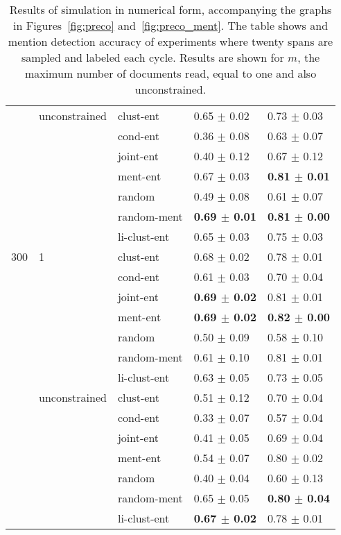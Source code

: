 \begin{table*}
\begin{tabular}{lllll}
    \cline{2-5}
    & unconstrained & clust-ent &  0.65 $\pm$ 0.02 &  0.73 $\pm$ 0.03 \\
    &               & cond-ent &  0.36 $\pm$ 0.08 &  0.63 $\pm$ 0.07 \\
    &               & joint-ent &  0.40 $\pm$ 0.12 &  0.67 $\pm$ 0.12 \\
    &               & ment-ent &  0.67 $\pm$ 0.03 &  \textbf{0.81 $\pm$ 0.01} \\
    &               & random &  0.49 $\pm$ 0.08 &  0.61 $\pm$ 0.07 \\
    &               & random-ment &  \textbf{0.69 $\pm$ 0.01} &  \textbf{0.81 $\pm$ 0.00} \\
    &               & li-clust-ent &  0.65 $\pm$ 0.03 &  0.75 $\pm$ 0.03 \\
    \cline{1-5}
300 & 1 & clust-ent &  0.68 $\pm$ 0.02 &  0.78 $\pm$ 0.01 \\
    &               & cond-ent &  0.61 $\pm$ 0.03 &  0.70 $\pm$ 0.04 \\
    &               & joint-ent &  \textbf{0.69 $\pm$ 0.02} &  0.81 $\pm$ 0.01 \\
    &               & ment-ent &  \textbf{0.69 $\pm$ 0.02} &  \textbf{0.82 $\pm$ 0.00} \\
    &               & random &  0.50 $\pm$ 0.09 &  0.58 $\pm$ 0.10 \\
    &               & random-ment &  0.61 $\pm$ 0.10 &  0.81 $\pm$ 0.01 \\
    &               & li-clust-ent &  0.63 $\pm$ 0.05 &  0.73 $\pm$ 0.05 \\
    \cline{2-5}
    & unconstrained & clust-ent &  0.51 $\pm$ 0.12 &  0.70 $\pm$ 0.04 \\
    &               & cond-ent &  0.33 $\pm$ 0.07 &  0.57 $\pm$ 0.04 \\
    &               & joint-ent &  0.41 $\pm$ 0.05 &  0.69 $\pm$ 0.04 \\
    &               & ment-ent &  0.54 $\pm$ 0.07 &  0.80 $\pm$ 0.02 \\
    &               & random &  0.40 $\pm$ 0.04 &  0.60 $\pm$ 0.13 \\
    &               & random-ment &  0.65 $\pm$ 0.05 &  \textbf{0.80 $\pm$ 0.04} \\
    &               & li-clust-ent &  \textbf{0.67 $\pm$ 0.02} &  0.78 $\pm$ 0.01 \\
\bottomrule
\end{tabular}
    \caption{Results of \preco{} simulation in numerical form, accompanying the
    graphs in Figures~\ref{fig:preco} and~\ref{fig:preco_ment}. The table
    shows \avgfone{} and mention detection accuracy of experiments where twenty
    spans are sampled and labeled each cycle. Results are shown for $m$, the
    maximum number of documents read, equal to one and also unconstrained.
    }
\label{tab:preco_num}
\end{table*}
